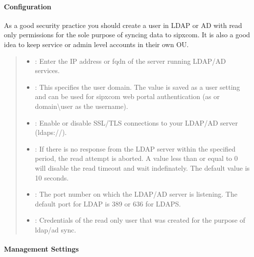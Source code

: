 \documentclass[letterpaper,10pt,english]{sphinxmanual}
\begin{document}
\paragraph{Configuration}
\label{\detokenize{webui:configuration}}
As a good security practice you should create a user in LDAP or AD with read only permissions for the sole purpose of syncing data to sipxcom. It is also a good idea to keep service or admin level accounts in their own OU.
\begin{quote}

\begin{itemize}
\item {} 
: Enter the IP address or fqdn of the server running LDAP/AD services.

\item {} 
: This specifies the user domain. The value is saved as a user setting and can be used for sipxcom web portal authentication (as  or domain\textbackslash{}user as the username).

\item {} 
: Enable or disable SSL/TLS connections to your LDAP/AD server (ldaps://).

\item {} 
: If there is no response from the LDAP server within the specified period, the read attempt is aborted. A value less than or equal to 0 will disable the read timeout and wait indefinately. The default value is 10 seconds.

\item {} 
: The port number on which the LDAP/AD server is listening. The default port for LDAP is 389 or 636 for LDAPS.

\item {} 
: Credentials of the read only user that was created for the purpose of ldap/ad sync.

\end{itemize}
\end{quote}


\paragraph{Management Settings}
\label{\detokenize{webui:management-settings}}\begin{quote}

\end{quote}
\end{document}
